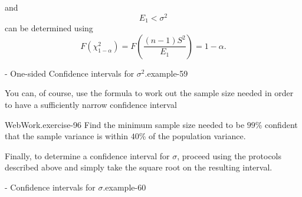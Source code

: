 \documentclass[10pt,]{book}
\numberwithin{equation}{section}
\newcommand{\lt}{<}
\begin{document}
and%
\begin{equation*}
E_1 \lt \sigma^2 
\end{equation*}
can be determined using%
\begin{equation*}
F(\chi^2_{1-\alpha} ) = F \left ( \frac{(n-1)S^2}{E_1} \right ) = 1 - \alpha.
\end{equation*}
\begin{example}{- One-sided Confidence intervals for \(\sigma^2\).}{example-59}%
\hypertarget{p-1411}{}%
%
\end{example}
%
\par
\hypertarget{p-1412}{}%
You can, of course, use the formula to work out the sample size needed in order to have a sufficiently narrow confidence interval%
\par
\hypertarget{p-1413}{}%
\begin{inlineexercise}{WebWork.}{exercise-96}%
\hypertarget{p-1414}{}%
Find the minimum sample size needed to be \(99\)\%  confident that the sample variance is within \(40\)\% of the population variance.%
\end{inlineexercise}
%
\par
\hypertarget{p-1416}{}%
Finally, to determine a confidence interval for \(\sigma\), proceed using the protocols described above and simply take the square root on the resulting interval. \begin{example}{- Confidence intervals for \(\sigma\).}{example-60}%
\hypertarget{p-1417}{}%
%
\end{example}
%
%
%
\typeout{************************************************}
\typeout{************************************************}
%
\end{document}
